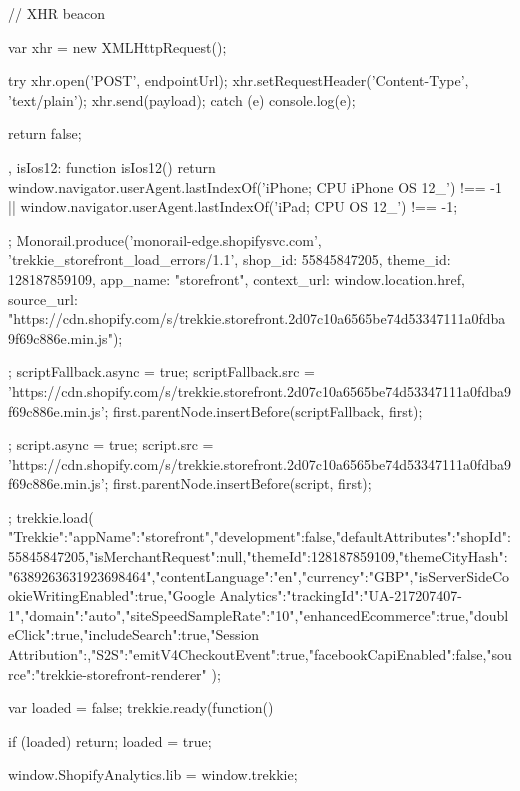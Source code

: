{{{{{{{{{{{{        } // XHR beacon   
    
        var xhr = new XMLHttpRequest();
    
        try {
          xhr.open('POST', endpointUrl);
          xhr.setRequestHeader('Content-Type', 'text/plain');
          xhr.send(payload);
        } catch (e) {
          console.log(e);
        }
    
        return false;
      },
      isIos12: function isIos12() {
        return window.navigator.userAgent.lastIndexOf('iPhone; CPU iPhone OS 12_') !== -1 || window.navigator.userAgent.lastIndexOf('iPad; CPU OS 12_') !== -1;
      }
    };
    Monorail.produce('monorail-edge.shopifysvc.com',
      'trekkie_storefront_load_errors/1.1',
      {shop_id: 55845847205,
      theme_id: 128187859109,
      app_name: "storefront",
      context_url: window.location.href,
      source_url: "https://cdn.shopify.com/s/trekkie.storefront.2d07c10a6565be74d53347111a0fdba9f69c886e.min.js"});

      };
      scriptFallback.async = true;
      scriptFallback.src = 'https://cdn.shopify.com/s/trekkie.storefront.2d07c10a6565be74d53347111a0fdba9f69c886e.min.js';
      first.parentNode.insertBefore(scriptFallback, first);
    };
    script.async = true;
    script.src = 'https://cdn.shopify.com/s/trekkie.storefront.2d07c10a6565be74d53347111a0fdba9f69c886e.min.js';
    first.parentNode.insertBefore(script, first);
  };
  trekkie.load(
    {"Trekkie":{"appName":"storefront","development":false,"defaultAttributes":{"shopId":55845847205,"isMerchantRequest":null,"themeId":128187859109,"themeCityHash":"6389263631923698464","contentLanguage":"en","currency":"GBP"},"isServerSideCookieWritingEnabled":true},"Google Analytics":{"trackingId":"UA-217207407-1","domain":"auto","siteSpeedSampleRate":"10","enhancedEcommerce":true,"doubleClick":true,"includeSearch":true},"Session Attribution":{},"S2S":{"emitV4CheckoutEvent":true,"facebookCapiEnabled":false,"source":"trekkie-storefront-renderer"}}
  );

  var loaded = false;
  trekkie.ready(function() {
    if (loaded) return;
    loaded = true;

    window.ShopifyAnalytics.lib = window.trekkie;
    
}}}}}}}
